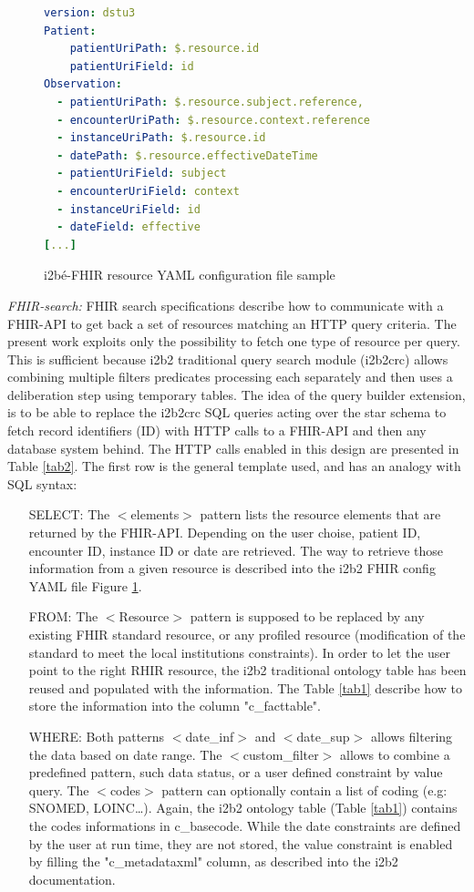 \documentclass{amia}
\newcommand{\remXavier}[1]{\todo[color=yellow]{[XT]{\scriptsize #1\par}}}
\newcommand{\remNico}[1]{\todo[color=orange]{[NP]{\scriptsize #1\par}}}
\begin{document}
\begin{figure}
\begin{lstlisting}[language=yaml]
version: dstu3
Patient:
    patientUriPath: $.resource.id
    patientUriField: id
Observation:
  - patientUriPath: $.resource.subject.reference,
  - encounterUriPath: $.resource.context.reference
  - instanceUriPath: $.resource.id
  - datePath: $.resource.effectiveDateTime
  - patientUriField: subject
  - encounterUriField: context
  - instanceUriField: id
  - dateField: effective
[...]
\end{lstlisting}
  \caption{i2bé-FHIR resource YAML configuration file sample}
	\label{conf1}
\end{figure}
\textit{FHIR-search:} FHIR search specifications describe how to communicate with a FHIR-API to get back a set of resources matching an HTTP query criteria. The present work exploits only the possibility to fetch one type of resource per query. This is sufficient because i2b2 traditional query search module (i2b2crc) allows combining multiple filters predicates processing each separately and then uses a deliberation step using temporary tables. The idea of the query builder extension, is to be able to replace the i2b2crc SQL queries acting over the star schema to fetch record identifiers (ID) with HTTP calls to a FHIR-API and then any database system behind. The HTTP calls enabled in this design are presented in Table \ref{tab2}. The first row is the general template used, and has an analogy with SQL syntax:
\begin{itemize}
	\item[SELECT:] The $<$elements$>$ pattern lists the resource elements that are returned by the FHIR-API. Depending on the user choise, patient ID, encounter ID, instance ID or date are retrieved. The way to retrieve those information from a given resource is described into the i2b2 FHIR config YAML file Figure \ref{conf1}.
	\item[FROM:] The $<$Resource$>$ pattern is supposed to be replaced by any existing FHIR standard resource, or any profiled resource (modification of the standard to meet the local institutions constraints). In order to let the user point to the right RHIR resource, the i2b2 traditional ontology table has been reused and populated with the information. The Table \ref{tab1} describe how to store the information into the column "c\_facttable".
	\item [WHERE:] Both patterns $<$date\_inf$>$ and $<$date\_sup$>$ allows filtering the data based on date range. The $<$custom\_filter$>$ allows to combine a predefined pattern, such data status, or a user defined constraint by value query. The $<$codes$>$ pattern can optionally contain a list of coding (e.g: SNOMED, LOINC\ldots). Again, the i2b2 ontology table (Table \ref{tab1}) contains the codes informations in c\_basecode. While the date constraints are defined by the user at run time, they are not stored, the value constraint is enabled by filling the "c\_metadataxml" column, as described into the i2b2 documentation.\remXavier{un peu trop détaillé ?} \remNico{je vais clarifier voire simplifier}
\end{itemize}
\end{document}
